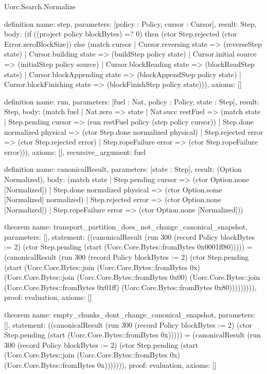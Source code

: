 \begin{lexlean}{Uorc.Search.Normalize}
\begin{semanticmodule}
definition{
  name: step,
  parameters: [policy : Policy, cursor : Cursor],
  result: Step,
  body: (if ((project policy blockBytes) =? 0) then (ctor Step.rejected (ctor Error.zeroBlockSize)) else (match cursor
    | Cursor.reversing state => (reverseStep state)
    | Cursor.building state => (buildStep policy state)
    | Cursor.initial source => (initialStep policy source)
    | Cursor.blockReading state => (blockReadStep state)
    | Cursor.blockAppending state => (blockAppendStep policy state)
    | Cursor.blockFinishing state => (blockFinishStep policy state))),
  axioms: []
}

definition{
  name: run,
  parameters: [fuel : Nat, policy : Policy, state : Step],
  result: Step,
  body: (match fuel
    | Nat.zero => state
    | Nat.succ restFuel => (match state
      | Step.pending cursor => (run restFuel policy (step policy cursor))
      | Step.done normalized physical => (ctor Step.done normalized physical)
      | Step.rejected error => (ctor Step.rejected error)
      | Step.ropeFailure error => (ctor Step.ropeFailure error))),
  axioms: [],
  recursive_argument: fuel
}

definition{
  name: canonicalResult,
  parameters: [state : Step],
  result: (Option Normalized),
  body: (match state
    | Step.pending cursor => (ctor Option.none [Normalized])
    | Step.done normalized physical => (ctor Option.some [Normalized] normalized)
    | Step.rejected error => (ctor Option.none [Normalized])
    | Step.ropeFailure error => (ctor Option.none [Normalized]))
}

theorem{
  name: transport_partition_does_not_change_canonical_snapshot,
  parameters: [],
  statement: ((canonicalResult (run 300 (record Policy {blockBytes := 2}) (ctor Step.pending (start (Uorc.Core.Bytes::fromBytes 0x0001ff80))))) = (canonicalResult (run 300 (record Policy {blockBytes := 2}) (ctor Step.pending (start (Uorc.Core.Bytes::join (Uorc.Core.Bytes::fromBytes 0x) (Uorc.Core.Bytes::join (Uorc.Core.Bytes::fromBytes 0x00) (Uorc.Core.Bytes::join (Uorc.Core.Bytes::fromBytes 0x01ff) (Uorc.Core.Bytes::fromBytes 0x80))))))))),
  proof: evaluation{},
  axioms: []
}

theorem{
  name: empty_chunks_dont_change_canonical_snapshot,
  parameters: [],
  statement: ((canonicalResult (run 300 (record Policy {blockBytes := 2}) (ctor Step.pending (start (Uorc.Core.Bytes::fromBytes 0x))))) = (canonicalResult (run 300 (record Policy {blockBytes := 2}) (ctor Step.pending (start (Uorc.Core.Bytes::join (Uorc.Core.Bytes::fromBytes 0x) (Uorc.Core.Bytes::fromBytes 0x))))))),
  proof: evaluation{},
  axioms: []
}


\end{semanticmodule}
\end{lexlean}
